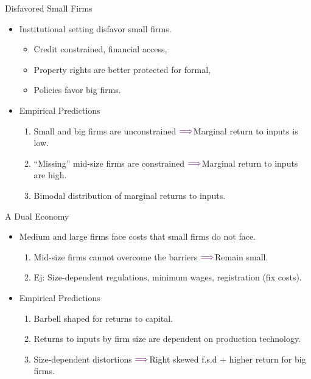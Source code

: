 \documentclass[usenames,dvipsnames,aspectratio=32]{beamer}
\newcommand{\thus}{$\textcolor{violet}{\Longrightarrow}$}
\begin{document}
\begin{frame}{Disfavored Small Firms}
    \begin{itemize}[label=\textcolor{violet}{$\blacktriangleright$}]
        \item Institutional setting disfavor small firms. 
        \begin{itemize}[label=\textcolor{violet}{\small{$\blacktriangleright$}}]
            \item Credit constrained, financial access,
            \item Property rights are better protected for formal, 
            \item Policies favor big firms. 
        \end{itemize}
        \vfill
        \item Empirical Predictions
        \begin{enumerate}[label=\textbf{\textcolor{violet}{\arabic*.}}]
            \item Small and big firms are unconstrained \thus Marginal return to inputs is low. 
            \item ``Missing'' mid-size firms are constrained \thus Marginal return to inputs are high. 
            \item Bimodal distribution of marginal returns to inputs. 
        \end{enumerate}
    \end{itemize}
\end{frame}

\begin{frame}{A Dual Economy}
    \begin{itemize}[label=\textcolor{violet}{$\blacktriangleright$}]
        \item Medium and large firms face costs that small firms do not face. 
        \begin{enumerate}[label=\textbf{\textcolor{violet}{\arabic*.}}]
            \item Mid-size firms cannot overcome the barriers \thus Remain small. 
            \item Ej: Size-dependent regulations, minimum wages, registration (fix costs). 
        \end{enumerate}
        \vfill
        \item Empirical Predictions
        \begin{enumerate}[label=\textbf{\textcolor{violet}{\arabic*.}}]
            \item Barbell shaped for returns to capital. 
            \item Returns to inputs by firm size are dependent on production technology. 
            \item Size-dependent distortions \thus Right skewed f.s.d + higher return for big firms. 
        \end{enumerate}
    \end{itemize}
\end{frame}
\end{document}
